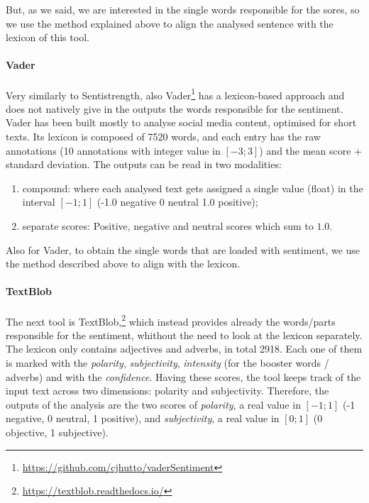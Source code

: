But, as we said, we are interested in the single words responsible for the sores, so we use the method explained above to align the analysed sentence with the lexicon of this tool.

\paragraph{Vader}
Very similarly to Sentistrength, also Vader\footnote{\url{https://github.com/cjhutto/vaderSentiment}} has a lexicon-based approach and does not natively give in the outputs the words responsible for the sentiment. Vader has been built mostly to analyse social media content, optimised for short texts.
Its lexicon is composed of 7520 words, and each entry has the raw annotations (10 annotations with integer value in $[-3;3]$) and the mean score + standard deviation.
The outputs can be read in two modalities:
\begin{enumerate}
    \item compound: where each analysed text gets assigned a single value (float) in the interval $[-1;1]$ (-1.0 negative 0 neutral 1.0 positive);
    \item separate scores: Positive, negative and neutral scores which sum to $1.0$.
\end{enumerate}

Also for Vader, to obtain the single words that are loaded with sentiment, we use the method described above to align with the lexicon.



\paragraph{TextBlob}
The next tool is TextBlob,\footnote{\url{ https://textblob.readthedocs.io/}} which instead provides already the words/parts responsible for the sentiment, whithout the need to look at the lexicon separately.
The lexicon only contains adjectives and adverbs, in total 2918. Each one of them is marked with the \emph{polarity}, \emph{subjectivity}, \emph{intensity} (for the booster words / adverbs) %
and with the \emph{confidence}. Having these scores, the tool keeps track of the input text across two dimensions: polarity and subjectivity.
Therefore, the outputs of the analysis are the two scores of \emph{polarity}, a real value in $[-1;1]$ (-1 negative, 0 neutral, 1 positive), and \emph{subjectivity}, a real value in $[0;1]$ (0 objective, 1 subjective).

